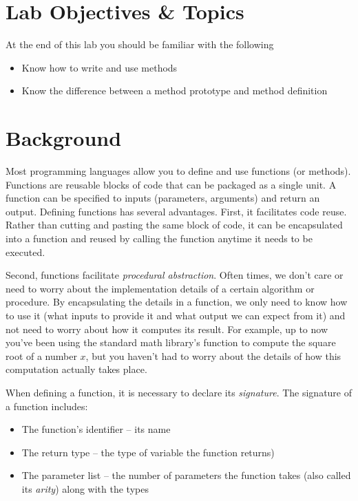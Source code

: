 \documentclass[12pt]{scrartcl}
\begin{document}
\section{Lab Objectives \& Topics}
At the end of this lab you should be familiar with the following
\begin{itemize}
  \item Know how to write and use methods
  \item Know the difference between a method prototype and method definition
\end{itemize}

\section{Background}

Most programming languages allow you to define and use functions 
(or methods).  Functions are reusable blocks of code that can be 
packaged as a single unit.  A function can be specified to inputs 
(parameters, arguments) and return an output.  Defining functions 
has several advantages.  First, it facilitates code reuse.  Rather than 
cutting and pasting the same block of code, it can be encapsulated 
into a function and reused by calling the function anytime it needs 
to be executed.

Second, functions facilitate \emph{procedural abstraction}.  Often 
times, we don't care or need to worry about the implementation 
details of a certain algorithm or procedure.  By encapsulating the 
details in a function, we only need to know how to use it (what 
inputs to provide it and what output we can expect from it) and 
not need to worry about how it computes its result.  For example,
up to now you've been using the standard math library's function
to compute the square root of a number $x$, but you haven't
had to worry about the details of how this computation actually
takes place.

When defining a function, it is necessary to declare its \emph{signature}.  
The signature of a function includes:
\begin{itemize}
  \item The function's identifier -- its name 
  \item The return type -- the type of variable the function returns)
  \item The parameter list -- the number of parameters the function takes 
	(also called its \emph{arity}) along with the types 
\end{itemize}
\end{document}

